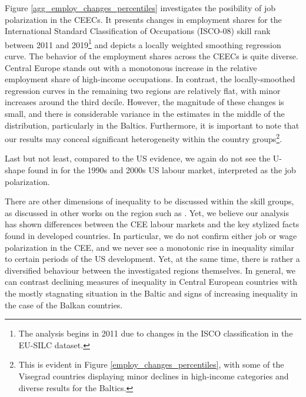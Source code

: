 \documentclass[11pt]{article}
\begin{document}
Figure \ref{agg_employ_changes_percentiles} investigates the posibility of job polarization in the CEECs. It presents changes in employment shares for the International Standard Classification of Occupations (ISCO-08) skill rank between 2011 and 2019\footnote{The analysis begins in 2011 due to changes in the ISCO classification in the EU-SILC dataset.} and depicts a locally weighted smoothing regression curve. The behavior of the employment shares across the CEECs is quite diverse. Central Europe stands out with a monotonous increase in the relative employment share of high-income occupations. In contrast, the locally-smoothed regression curves in the remaining two regions are relatively flat, with minor increases around the third decile. However, the magnitude of these changes is small, and there is considerable variance in the estimates in the middle of the distribution, particularly in the Baltics. Furthermore, it is important to note that our results may conceal significant heterogeneity within the country groups\footnote{This is evident in Figure \ref{employ_changes_percentiles}, with some of the Visegrad countries displaying minor declines in high-income categories and diverse results for the Baltics.}.

Last but not least, compared to the US evidence, we again do not see the  U-shape found in \citet{acemoglu2012does} for the 1990s and 2000s US labour market, interpreted as the job polarization.


There are other dimensions of inequality to be discussed within the skill groups, as discussed in other works on the region such as \cite{magda2021firms}. Yet, we believe our analysis has shown differences between the CEE labour markets and the key stylized facts found in developed countries. In particular, we do not confirm either job or wage polarization in the CEE, and we never see a monotonic rise in inequality similar to certain periods of the US development. Yet, at the same time, there is rather a diversified behaviour between the investigated regions themselves. In general, we can contrast declining measures of inequality in Central European countries with the mostly stagnating situation in the Baltic and signs of increasing inequality in the case of the Balkan countries.
\end{document}
